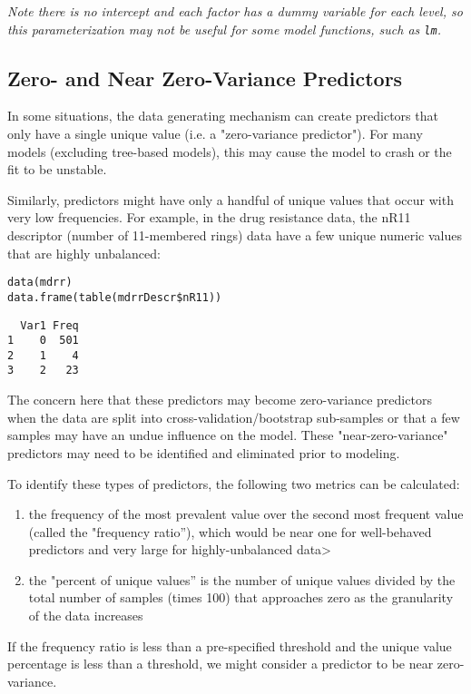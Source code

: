\documentclass[caret-main.tex]{subfiles}
\begin{document}
\noindent \textit{Note there is no intercept and each factor has a dummy variable for each level, so this parameterization may not be useful for some model functions, such as \texttt{lm}.}
\subsection{Zero- and Near Zero-Variance Predictors}

In some situations, the data generating mechanism can create predictors that only have a single unique value (i.e. a "zero-variance predictor"). For many models (excluding tree-based models), this may cause the model to crash or the fit to be unstable.

Similarly, predictors might have only a handful of unique values that occur with very low frequencies. For example, in the drug resistance data, the nR11 descriptor (number of 11-membered rings) data have a few unique numeric values that are highly unbalanced:
\begin{framed}
\begin{verbatim}
data(mdrr)
data.frame(table(mdrrDescr$nR11))
\end{verbatim}
\end{framed}
\begin{verbatim}
  Var1 Freq
1    0  501
2    1    4
3    2   23
\end{verbatim}
The concern here that these predictors may become zero-variance predictors when the data are split into cross-validation/bootstrap sub-samples or that a few samples may have an undue influence on the model. These "near-zero-variance" predictors may need to be identified and eliminated prior to modeling.

To identify these types of predictors, the following two metrics can be calculated:
\begin{enumerate}
\item the frequency of the most prevalent value over the second most frequent value (called the "frequency ratio''), which would be near one for well-behaved predictors and very large for highly-unbalanced data>
\item the "percent of unique values'' is the number of unique values divided by the total number of samples (times 100) that approaches zero as the granularity of the data increases
\end{enumerate}
If the frequency ratio is less than a pre-specified threshold and the unique value percentage is less than a threshold, we might consider a predictor to be near zero-variance.
\end{document}
